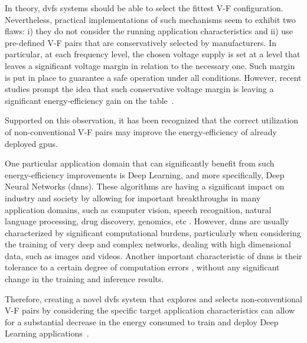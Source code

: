 In theory, \acrshort{dvfs} systems should be able to select the fittest V-F configuration. Nevertheless, practical implementations of such mechanisms seem to exhibit two flaws: i) they do not consider the running application characteristics and ii) use pre-defined V-F pairs that are conservatively selected by manufacturers. In particular, at each frequency level, the chosen voltage supply is set at a level that leaves a significant voltage margin in relation to the necessary one. Such margin is put in place to guarantee a safe operation under all conditions. However, recent studies prompt the idea that such conservative voltage margin is leaving a significant energy-efficiency gain on the table~\cite{leng_safe_2015}. 

Supported on this observation, it has been recognized that the correct utilization of non-conventional V-F pairs may improve the energy-efficiency of already deployed \acrshort{gpu}s.

One particular application domain that can significantly benefit from such energy-efficiency improvements is Deep Learning, and more specifically, Deep Neural Networks (\acrshort{dnn}s). These algorithms are having a significant impact on industry and society by allowing for important breakthroughs in many application domains, such as computer vision, speech recognition, natural language processing, drug discovery, genomics, etc \cite{shrestha_review_2019}. However, \acrshort{dnn}s are usually characterized by significant computational burdens, particularly when considering the training of very deep and complex networks, dealing with high dimensional data, such as images and videos. Another important characteristic of \acrshort{dnn}s is their tolerance to a certain degree of computation errors \cite{zhang_approxann_2015}, without any significant change in the training and inference results. 

Therefore, creating a novel \acrshort{dvfs} system that explores and selects non-conventional V-F pairs by considering the specific target application characteristics can allow for a substantial decrease in the energy consumed to train and deploy Deep Learning applications~\cite{tang_impact_2019}.





